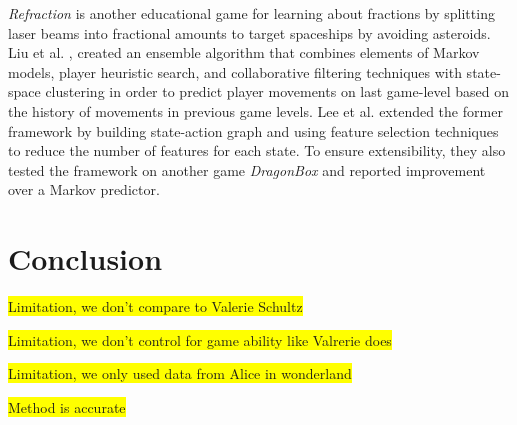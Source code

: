 \documentclass{sigchi}
\newcommand{\hl}[1]{\colorbox{yellow}{#1}}
\begin{document}
\textit {Refraction} is another educational game for learning about fractions by splitting laser beams into fractional amounts to target spaceships by avoiding asteroids. Liu et al. \cite{liu2013predicting}, created an ensemble algorithm that combines elements of Markov models, player heuristic search, and collaborative filtering techniques with state-space clustering in order to predict player movements on last game-level based on the history of movements in previous game levels. Lee et al. \cite{lee2014learning} extended the former framework by building state-action graph and using feature selection techniques to reduce the number of features for each state. To ensure extensibility, they also tested the framework on another game \textit {DragonBox} and reported improvement over a Markov predictor.

\section{Conclusion}
\hl{Limitation, we don't compare to Valerie Schultz}

\hl{Limitation, we don't control for game ability like Valrerie does}

\hl{Limitation, we only used data from Alice in wonderland}

\hl{Method is accurate}




\end{document}
